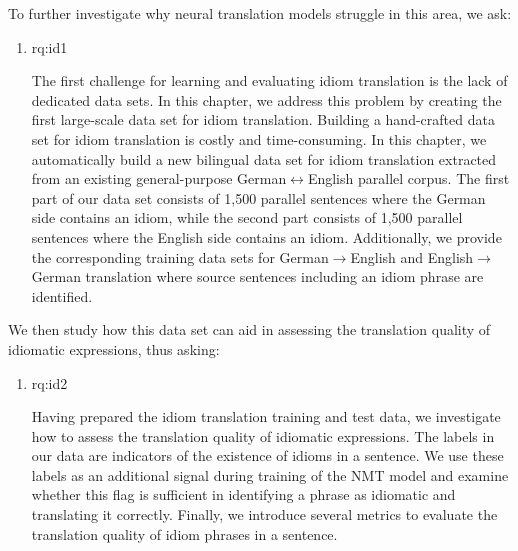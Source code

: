 To further investigate why neural translation models struggle in this area, we ask:

 
\begin{enumerate}[label=\textbf{RQ3.\arabic* },wide = 0pt, leftmargin=2em]
\setlength\itemsep{1em}
\item \acl{rq:id1}

\medskip

\noindent The first challenge for learning and evaluating idiom translation is the lack of dedicated data sets.
%
In this chapter, we address this problem by creating the first large-scale data set for idiom translation. %
Building a hand-crafted data set for idiom translation is costly and time-consuming.
In this chapter, we automatically build a new bilingual data set for idiom translation 
extracted from an existing general-purpose German$\leftrightarrow$English parallel corpus.
%
The first part of our data set consists of 1,500 parallel sentences where the German side contains an idiom, while the second part consists of 1,500 parallel sentences where the English side contains an idiom.
%
Additionally, we provide the corresponding training data sets for German$\rightarrow$English and English$\rightarrow$German translation where source sentences including an idiom phrase are identified. 

\end{enumerate}

\noindent We then study how this data set can aid in assessing the translation quality of idiomatic expressions, thus asking: 

\begin{enumerate}[label=\textbf{RQ3.2 },wide = 0pt, leftmargin=2em]

\item \acl{rq:id2}

\medskip

\noindent Having prepared the idiom translation training and test data, we investigate how to assess the translation quality of idiomatic expressions. 
The labels in our data are indicators of the existence of idioms in a sentence. 
We use these labels as an additional signal during training of the NMT model and examine whether this flag is sufficient in identifying a phrase as idiomatic and translating it correctly. 
Finally, we introduce several metrics to evaluate the translation quality of idiom phrases in a sentence. 

\end{enumerate}


